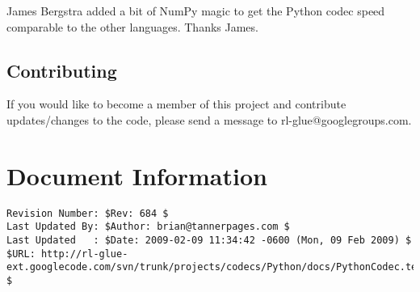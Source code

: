 \documentclass[11pt]{article}
\begin{document}
James Bergstra  added a bit of NumPy magic to get the Python codec speed comparable to the other languages.  Thanks James.


\subsection{Contributing}
If you would like to become a member of this project and contribute updates/changes to the code, please send a message to rl-glue@googlegroups.com.


\section*{Document Information}
\begin{verbatim}
Revision Number: $Rev: 684 $
Last Updated By: $Author: brian@tannerpages.com $
Last Updated   : $Date: 2009-02-09 11:34:42 -0600 (Mon, 09 Feb 2009) $
$URL: http://rl-glue-ext.googlecode.com/svn/trunk/projects/codecs/Python/docs/PythonCodec.tex $
\end{verbatim}
\end{document}
